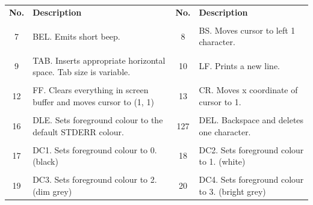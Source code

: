\begin{tabularx}{\textwidth}{c X c X}
	\textbf{\large No.} & \textbf{\large Description} & \textbf{\large No.} & \textbf{\large Description}
	\\ \\
	\endhead
	7 & BEL. Emits short beep. & 8 & BS. Moves cursor to left 1 character.
	\\ \\
	9 & TAB. Inserts appropriate horizontal space. Tab size is variable. & 10 & LF. Prints a new line.
	\\ \\
	12 & FF. Clears everything in screen buffer and moves cursor to (1, 1) & 13 & CR. Moves x coordinate of cursor to 1.
	\\ \\
	16 & DLE. Sets foreground colour to the default STDERR colour. & 127 & DEL. Backspace and deletes one character.
	\\ \\
	17 & DC1. Sets foreground colour to 0. (black) & 18 & DC2. Sets foreground colour to 1. (white)
	\\ \\
	19 & DC3. Sets foreground colour to 2. (dim grey) & 20 & DC4. Sets foreground colour to 3. (bright grey)
\end{tabularx}